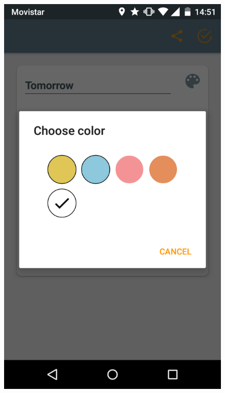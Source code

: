 \begin{itemize}
\begin{figure}[!h]
\includegraphics[scale=0.12]{Figures/crearNota2.png}

\end{figure}
\end{itemize}
